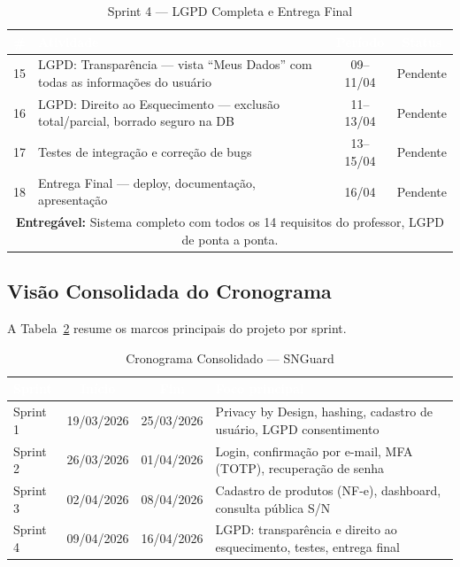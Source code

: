 \documentclass[12pt,a4paper]{article}
\begin{document}
\begin{table}[H]
  \centering
  \caption{Sprint 4 — LGPD Completa e Entrega Final}
  \label{tab:sprint4}
  \renewcommand{\arraystretch}{1.3}
  \small
  \begin{tabularx}{\textwidth}{|c|X|c|c|}
    \hline
    \rowcolor{cinzaHeader}
    \textcolor{white}{\textbf{\#}} &
    \textcolor{white}{\textbf{Atividade}} &
    \textcolor{white}{\textbf{Período}} &
    \textcolor{white}{\textbf{Status}} \\
    \hline
    \rowcolor{azulClaro}
    15 & LGPD: Transparência — vista ``Meus Dados'' com todas as informações do usuário & 09--11/04 & Pendente \\
    \hline
    \rowcolor{azulClaro}
    16 & LGPD: Direito ao Esquecimento — exclusão total/parcial, borrado seguro na DB & 11--13/04 & Pendente \\
    \hline
    \rowcolor{azulClaro}
    17 & Testes de integração e correção de bugs & 13--15/04 & Pendente \\
    \hline
    \rowcolor{azulClaro}
    18 & Entrega Final — deploy, documentação, apresentação & 16/04 & Pendente \\
    \hline
    \multicolumn{4}{|p{\dimexpr\textwidth-2\tabcolsep-2\arrayrulewidth}|}{%
      \textbf{Entregável:} Sistema completo com todos os 14 requisitos do professor, LGPD de ponta a ponta.} \\
    \hline
  \end{tabularx}
\end{table}

\subsection{Visão Consolidada do Cronograma}

A Tabela~\ref{tab:cronograma} resume os marcos principais do projeto por sprint.

\begin{table}[H]
  \centering
  \caption{Cronograma Consolidado — SNGuard}
  \label{tab:cronograma}
  \renewcommand{\arraystretch}{1.4}
  \small
  \begin{tabularx}{\textwidth}{|l|c|c|X|}
    \hline
    \rowcolor{cinzaHeader}
    \textcolor{white}{\textbf{Sprint}} &
    \textcolor{white}{\textbf{Início}} &
    \textcolor{white}{\textbf{Fim}} &
    \textcolor{white}{\textbf{Foco principal}} \\
    \hline
    \rowcolor{amarelo}
    Sprint 1 & 19/03/2026 & 25/03/2026 & Privacy by Design, hashing, cadastro de usuário, LGPD consentimento \\
    \hline
    \rowcolor{azulClaro}
    Sprint 2 & 26/03/2026 & 01/04/2026 & Login, confirmação por e-mail, MFA (TOTP), recuperação de senha \\
    \hline
    \rowcolor{azulClaro}
    Sprint 3 & 02/04/2026 & 08/04/2026 & Cadastro de produtos (NF-e), dashboard, consulta pública S/N \\
    \hline
    \rowcolor{azulClaro}
    Sprint 4 & 09/04/2026 & 16/04/2026 & LGPD: transparência e direito ao esquecimento, testes, entrega final \\
    \hline
  \end{tabularx}
\end{table}
\end{document}
